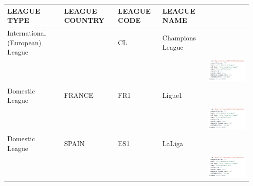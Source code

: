 \documentclass{Configuration_Files/PoliMi3i_thesis}
\begin{document}
\begin{tabular}{|p{3cm}|p{2cm}|p{2cm}|p{2cm}|p{7cm}|}
    \hline
    \rowcolor{bluepoli!40}
    \textbf{LEAGUE TYPE}          & \textbf{LEAGUE COUNTRY} & \textbf{LEAGUE CODE} & \textbf{LEAGUE NAME} & \\ \hline
    International (European) League &                        & CL                   & Champions League  & \\
    & & & &\includegraphics[scale=0.85]{Images/Leagues analysed/CL.png}   \\ \hline
    Domestic League                & FRANCE                 & FR1                  & Ligue1             & \\
    & & & &\includegraphics[scale=0.85]{Images/Leagues analysed/CL.png}  \\ \hline
    Domestic League                & SPAIN                  & ES1                  & LaLiga              & \\
    & & & &\includegraphics[scale=0.85]{Images/Leagues analysed/CL.png} \\ \hline
    \end{tabular}
\end{document}
